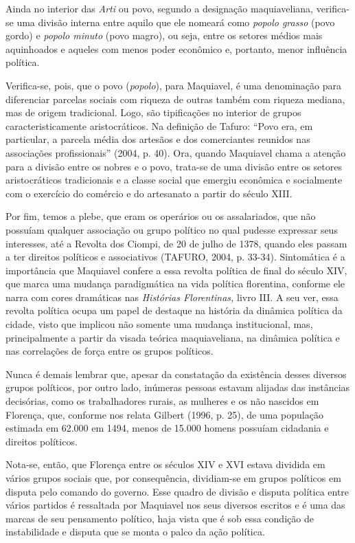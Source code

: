 Ainda no interior das \emph{Arti} ou povo, segundo a designação
maquiaveliana, verifica-se uma divisão interna entre aquilo que ele
nomeará como \emph{popolo grasso} (povo gordo) e \emph{popolo minuto}
(povo magro), ou seja, entre os setores médios mais aquinhoados e
aqueles com menos poder econômico e, portanto, menor influência
política.

Verifica-se, pois, que o povo (\emph{popolo}), para Maquiavel, é uma
denominação para diferenciar parcelas sociais com riqueza de outras
também com riqueza mediana, mas de origem tradicional. Logo, são
tipificações no interior de grupos caracteristicamente aristocráticos.
Na definição de Tafuro: ``Povo era, em particular, a parcela média dos
artesãos e dos comerciantes reunidos nas associações profissionais''
(2004, p. 40). Ora, quando Maquiavel chama a atenção para a divisão
entre os nobres e o povo, trata-se de uma divisão entre os setores
aristocráticos tradicionais e a classe social que emergiu econômica e
socialmente com o exercício do comércio e do artesanato a partir do
século XIII.

Por fim, temos a plebe, que eram os operários ou os assalariados, que
não possuíam qualquer associação ou grupo político no qual pudesse
expressar seus interesses, até a Revolta dos Ciompi, de 20 de julho de
1378, quando eles passam a ter direitos políticos e associativos
(TAFURO, 2004, p. 33-34). Sintomática é a importância que Maquiavel
confere a essa revolta política de final do século XIV, que marca uma
mudança paradigmática na vida política florentina, conforme ele narra
com cores dramáticas nas \emph{Histórias Florentinas,} livro III. A seu
ver, essa revolta política ocupa um papel de destaque na história da
dinâmica política da cidade, visto que implicou não somente uma mudança
institucional, mas, principalmente a partir da visada teórica
maquiaveliana, na dinâmica política e nas correlações de força entre os
grupos políticos.

Nunca é demais lembrar que, apesar da constatação da existência desses
diversos grupos políticos, por outro lado, inúmeras pessoas estavam
alijadas das instâncias decisórias, como os trabalhadores rurais, as
mulheres e os não nascidos em Florença, que, conforme nos relata Gilbert
(1996, p. 25), de uma população estimada em 62.000 em 1494, menos de
15.000 homens possuíam cidadania e direitos políticos.

Nota-se, então, que Florença entre os séculos XIV e XVI estava dividida
em vários grupos sociais que, por consequência, dividiam-se em grupos
políticos em disputa pelo comando do governo. Esse quadro de divisão e
disputa política entre vários partidos é ressaltada por Maquiavel nos
seus diversos escritos e é uma das marcas de seu pensamento político,
haja vista que é sob essa condição de instabilidade e disputa que se
monta o palco da ação política.

